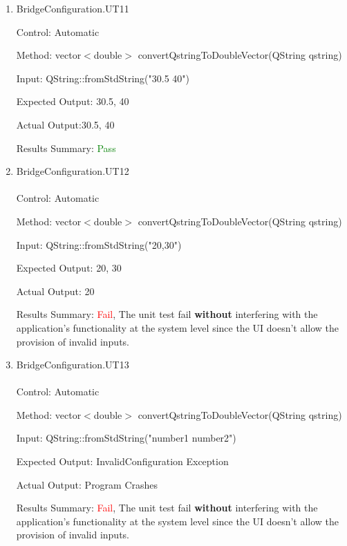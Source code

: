 \documentclass[12pt, titlepage]{article}
\begin{document}
\begin{enumerate}
    \item {BridgeConfiguration.UT11\\}

    Control: Automatic
    
    Method:  vector$<$double$>$ convertQstringToDoubleVector(QString qstring)
    
    Input: QString::fromStdString("30.5 40")
    
    Expected Output: {30.5, 40}

    Actual Output:{30.5, 40}

    Results Summary: \textcolor{green} {Pass}

    \item {BridgeConfiguration.UT12\\\\}
    Control: Automatic
    
    Method:  vector$<$double$>$ convertQstringToDoubleVector(QString qstring)
    
    Input: QString::fromStdString("20,30")
    
    Expected Output: {20, 30}

    Actual Output: {20}

    Results Summary: \textcolor{red} {Fail}, The unit test fail
\textbf{without} interfering with the application’s functionality at the system level
since the UI doesn’t allow the provision of invalid inputs.

    \item {BridgeConfiguration.UT13\\\\}
    Control: Automatic
    
    Method:  vector$<$double$>$ convertQstringToDoubleVector(QString qstring)
    
    Input: QString::fromStdString("number1 number2")
    
    Expected Output: InvalidConfiguration Exception

    Actual Output: Program Crashes

    Results Summary: \textcolor{red} {Fail}, The unit test fail
\textbf{without} interfering with the application’s functionality at the system level
since the UI doesn’t allow the provision of invalid inputs.

\end{enumerate}
\end{document}
